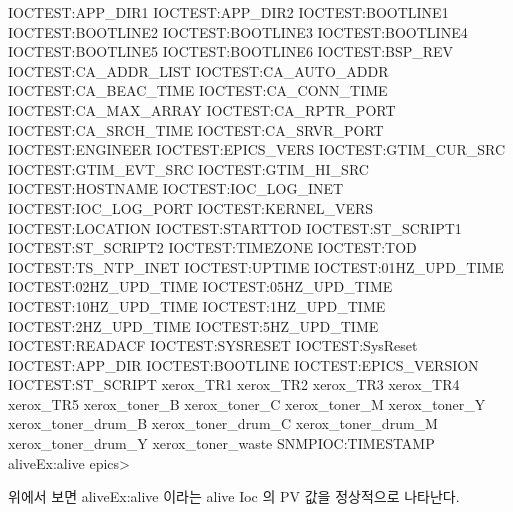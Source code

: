 IOCTEST:APP_DIR1
IOCTEST:APP_DIR2
IOCTEST:BOOTLINE1
IOCTEST:BOOTLINE2
IOCTEST:BOOTLINE3
IOCTEST:BOOTLINE4
IOCTEST:BOOTLINE5
IOCTEST:BOOTLINE6
IOCTEST:BSP_REV
IOCTEST:CA_ADDR_LIST
IOCTEST:CA_AUTO_ADDR
IOCTEST:CA_BEAC_TIME
IOCTEST:CA_CONN_TIME
IOCTEST:CA_MAX_ARRAY
IOCTEST:CA_RPTR_PORT
IOCTEST:CA_SRCH_TIME
IOCTEST:CA_SRVR_PORT
IOCTEST:ENGINEER
IOCTEST:EPICS_VERS
IOCTEST:GTIM_CUR_SRC
IOCTEST:GTIM_EVT_SRC
IOCTEST:GTIM_HI_SRC
IOCTEST:HOSTNAME
IOCTEST:IOC_LOG_INET
IOCTEST:IOC_LOG_PORT
IOCTEST:KERNEL_VERS
IOCTEST:LOCATION
IOCTEST:STARTTOD
IOCTEST:ST_SCRIPT1
IOCTEST:ST_SCRIPT2
IOCTEST:TIMEZONE
IOCTEST:TOD
IOCTEST:TS_NTP_INET
IOCTEST:UPTIME
IOCTEST:01HZ_UPD_TIME
IOCTEST:02HZ_UPD_TIME
IOCTEST:05HZ_UPD_TIME
IOCTEST:10HZ_UPD_TIME
IOCTEST:1HZ_UPD_TIME
IOCTEST:2HZ_UPD_TIME
IOCTEST:5HZ_UPD_TIME
IOCTEST:READACF
IOCTEST:SYSRESET
IOCTEST:SysReset
IOCTEST:APP_DIR
IOCTEST:BOOTLINE
IOCTEST:EPICS_VERSION
IOCTEST:ST_SCRIPT
xerox_TR1
xerox_TR2
xerox_TR3
xerox_TR4
xerox_TR5
xerox_toner_B
xerox_toner_C
xerox_toner_M
xerox_toner_Y
xerox_toner_drum_B
xerox_toner_drum_C
xerox_toner_drum_M
xerox_toner_drum_Y
xerox_toner_waste
SNMPIOC:TIMESTAMP
aliveEx:alive
epics> 

위에서 보면 aliveEx:alive 이라는 alive Ioc 의 PV 값을 정상적으로 나타난다.


